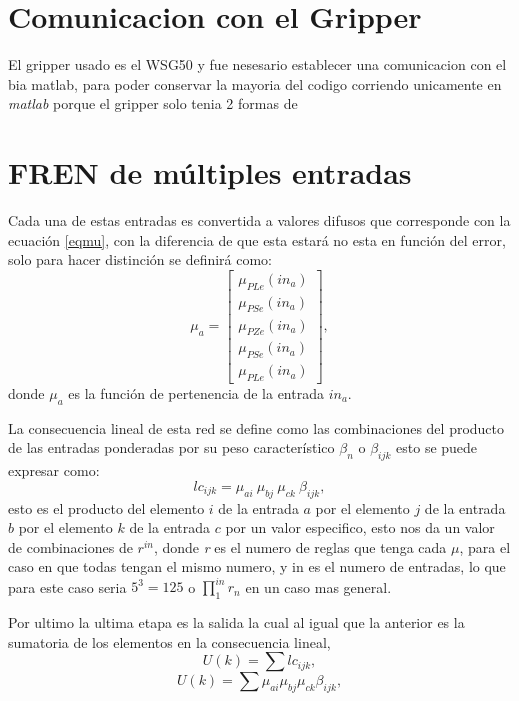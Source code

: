     \section{Comunicacion con el Gripper}
    
	El gripper usado es el WSG50 y fue nesesario establecer una comunicacion con el bia matlab, para poder conservar la mayoria del codigo corriendo unicamente en \textit{matlab} porque el gripper solo tenia 2 formas de 
    
    \section{FREN de múltiples entradas}
    Cada una de estas entradas es convertida a valores difusos que corresponde con la ecuación \ref{eqmu}, con la diferencia de que esta estará no esta en función del error, solo para hacer distinción se definirá como:
    \begin{equation}
    \label{eqmmu}
    \mu_a=\begin{bmatrix}
    	\mu_{PLe}(in_a) \\ 
    	\mu_{PSe}(in_a)\\ 
    	\mu_{PZe}(in_a)\\ 
    	\mu_{PSe}(in_a)\\ 
    	\mu_{PLe}(in_a)
    \end{bmatrix}  ,
\end{equation}
    donde $\mu_a$ es la función de pertenencia de la entrada $in_a$.
    
    La consecuencia lineal de esta red se define como las combinaciones del producto de las entradas ponderadas por su peso característico $\beta_n$ o $\beta_{ijk}$
    esto se puede expresar como: \begin{equation}
    lc_{ijk}=\mu_{ai}\ \mu_{bj} \ \mu_{ck} \ \beta_{ijk},
    \end{equation}
    esto es el producto del elemento $i$ de la entrada $a$ por el elemento $j$ de la entrada $b$ por el elemento $k$ de la entrada $c$ por un valor especifico, esto nos da un valor de combinaciones de $r^{in}$, donde \textit{r} es el numero de reglas que tenga cada $\mu$, para el caso en que todas tengan el mismo numero, y in es el numero de entradas, lo que para este caso seria $5^3 = 125$ o $\prod_{1}^{in} r_n$
    en un caso mas general.
    
    Por ultimo la ultima etapa es la salida la cual al igual que la anterior es la sumatoria de los elementos en la consecuencia lineal, \begin{equation}    U(k)= \sum lc_{ijk} ,
    \end{equation}
    \begin{equation}
    U(k)= \sum  \mu_{ai} \mu_{bj} \mu_{ck} \beta_{ijk}  ,
    \end{equation}
    
